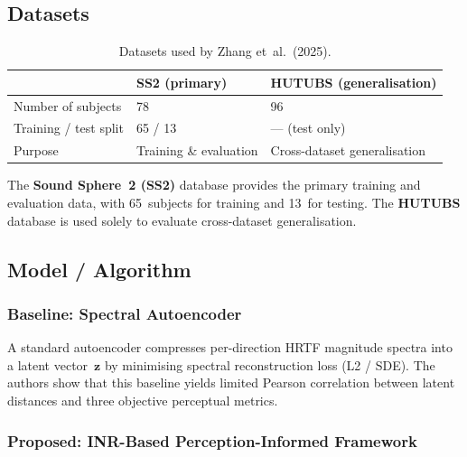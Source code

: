 \documentclass[12pt,a4paper]{article}
\begin{document}
\subsection{Datasets}

\begin{table}[h]
\centering
\caption{Datasets used by Zhang et~al.\ (2025).}
\label{tab:zhang_data}
\begin{tabular}{@{}lll@{}}
\toprule
                          & \textbf{SS2 (primary)} & \textbf{HUTUBS (generalisation)} \\ \midrule
Number of subjects        & 78                     & 96 \\
Training / test split     & 65 / 13                & --- (test only) \\
Purpose                   & Training \& evaluation & Cross-dataset generalisation \\
\bottomrule
\end{tabular}
\end{table}

The \textbf{Sound Sphere~2 (SS2)} database provides the primary training
and evaluation data, with 65~subjects for training and 13~for testing.
The \textbf{HUTUBS} database is used solely to evaluate cross-dataset
generalisation.

\subsection{Model / Algorithm}

\subsubsection{Baseline: Spectral Autoencoder}

A standard autoencoder compresses per-direction HRTF magnitude spectra
into a latent vector~$\mathbf{z}$ by minimising spectral reconstruction
loss (L2 / SDE).  The authors show that this baseline yields limited
Pearson correlation between latent distances and three objective
perceptual metrics.

\subsubsection{Proposed: INR-Based Perception-Informed Framework}
\end{document}
